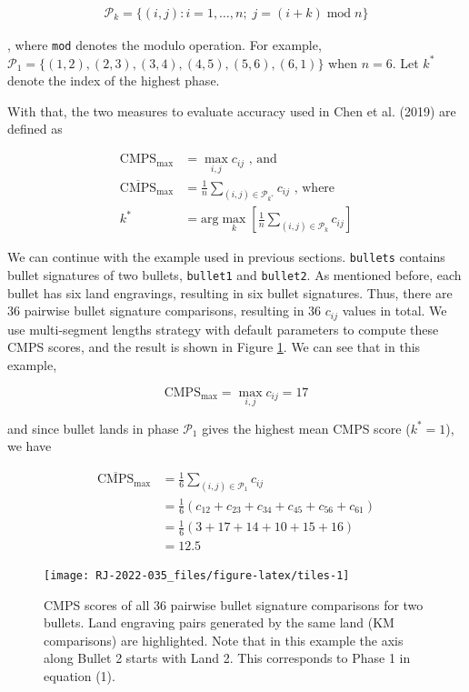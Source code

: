 \begin{align}
\mathcal{P}_k = \{ \left(i,j\right): i = 1, \dots, n ; \; j = \left(i + k\right) \;\mathrm{mod}\; n \}
\end{align}

, where \texttt{mod} denotes the modulo operation.
For example, \(\mathcal{P}_1 = \{ \left(1,2\right), \left(2,3\right), \left(3,4\right), \left(4,5\right), \left(5,6\right), \left(6,1\right) \}\) when \(n = 6\).
Let \(k^*\) denote the index of the highest phase.

With that, the two measures to evaluate accuracy used in Chen et al. (2019) are defined as

\begin{align}
\mathrm{CMPS_{max}} &= \max_{i,j} c_{ij} \text{ , and} \\
\mathrm{\overline{CMPS}_{max}} &= \frac{1}{n} \sum_{(i,j) \in \mathcal{P}_{k^*}} c_{ij} \text{ , where} \\
k^* &= \text{arg}\max\limits_{k} \left[  \frac{1}{n} \sum_{(i,j) \in \mathcal{P}_k} c_{ij}\right]
\end{align}

We can continue with the example used in previous sections.
\texttt{bullets} contains bullet signatures of two bullets, \texttt{bullet1} and \texttt{bullet2}.
As mentioned before, each bullet has six land engravings, resulting in six bullet signatures.
Thus, there are 36 pairwise bullet signature comparisons, resulting in 36 \(c_{ij}\) values in total.
We use multi-segment lengths strategy with default parameters to compute these CMPS scores, and the result is shown in Figure \ref{fig:tiles}.
We can see that in this example,

\[
\mathrm{CMPS_{max}} =  \max_{i,j} c_{ij} = 17
\]

and since bullet lands in phase \(\mathcal{P}_1\) gives the highest mean CMPS score (\(k^* = 1\)), we have

\[
\begin{aligned}
\mathrm{\overline{CMPS}_{max}} &= \frac{1}{6} \sum_{(i,j) \in \mathcal{P}_1} c_{ij} \\
                        &= \frac{1}{6} \left(c_{12} + c_{23} + c_{34} + c_{45} + c_{56} + c_{61}\right) \\
                        &= \frac{1}{6} \left(3+17+14+10+15+16\right) \\
                        &= 12.5
\end{aligned}
\]

\begin{figure}

{\centering \texttt{[image: RJ-2022-035\_files/figure-latex/tiles-1]} 

}

\caption{CMPS scores of all 36 pairwise bullet signature comparisons for two bullets. Land engraving pairs generated by the same land (KM comparisons) are highlighted. Note that in this example the axis along Bullet 2 starts with Land 2. This corresponds to Phase 1 in equation (1).}\label{fig:tiles}
\end{figure}

